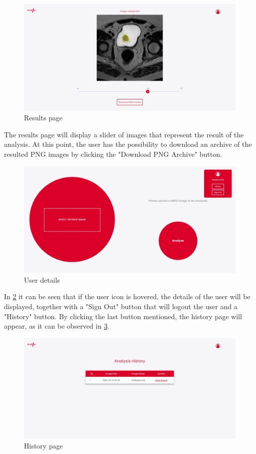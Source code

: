 \documentclass[runningheads,a4paper,11pt]{report}
\begin{document}
\begin{figure}[h!]
	\centerline{\includegraphics[width=17cm]{images/frontend_result.jpeg}}
	\caption{Results page}
	\label{frontend_result}
\end{figure}

The results page will display a slider of images that represent the result of the analysis. At this point, the user has the possibility to download an archive of the resulted PNG images by clicking the "Download PNG Archive" button.

\begin{figure}[h!]
	\centerline{\includegraphics[width=17cm]{images/frontend_userDetails.jpeg}}
	\caption{User details}
	\label{frontend_userDetails}
\end{figure}

In \ref{frontend_userDetails} it can be seen that if the user icon is hovered, the details of the user will be displayed, together with a "Sign Out" button that will logout the user and a "History" button. By clicking the last button mentioned, the history page will appear, as it can be observed in \ref{frontend_history}.

\begin{figure}[h!]
	\centerline{\includegraphics[width=17cm]{images/frontend_history.jpeg}}
	\caption{History page}
	\label{frontend_history}
\end{figure}
\end{document}
